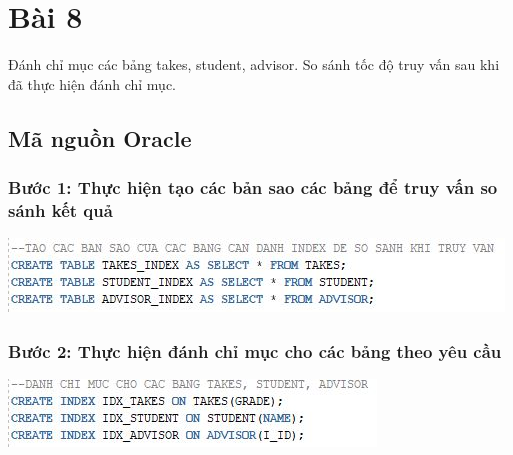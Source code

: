 \documentclass[12pt,a4paper]{report}
\begin{document}
\section{Bài 8}
\begin{boxedminipage}[t]{15.5cm}
Đánh chỉ mục các bảng takes, student, advisor. So sánh tốc độ truy vấn sau khi đã thực hiện đánh chỉ mục.
\end{boxedminipage}

\subsection{Mã nguồn Oracle}
\subsubsection{Bước 1: Thực hiện tạo các bản sao các bảng để truy vấn so sánh kết quả}
\includegraphics[scale=1]{b801}
\subsubsection{Bước 2: Thực hiện đánh chỉ mục cho các bảng theo yêu cầu}
\includegraphics[scale=1]{b802}
\end{document}
